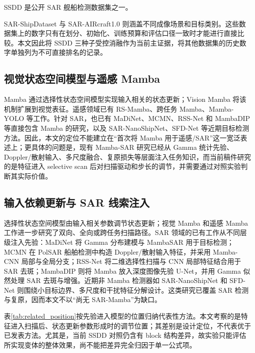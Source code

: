 \documentclass[UTF8,12pt,a4paper]{ctexart}
\begin{document}
SSDD 是公开 SAR 舰船检测数据集之一\cite{ssdd2017,ssdd2021}。

SAR-ShipDataset 与 SAR-AIRcraft1.0 则涵盖不同成像场景和目标类别\cite{sardataset,saraircraft}。这些数据集上的数字只有在划分、初始化、训练预算和评估口径一致时才能进行直接比较。本文因此将 SSDD 三种子受控消融作为当前主证据，将其他数据集的历史数字单独列为不可直接排名的记录。

\subsection{视觉状态空间模型与遥感 Mamba}
Mamba 通过选择性状态空间模型实现输入相关的状态更新\cite{mamba2023}；Vision Mamba 将该机制扩展到视觉表征\cite{vim2024}。遥感领域已有 RS-Mamba、跨任务 Mamba、Mamba-YOLO 等工作\cite{rsmamba2024,rstmtmamba2025,mambayolo2024}。针对 SAR，也已有 MaDiNet、MCMN、RSS-Net 和 MambaDIP 等直接包含 Mamba 的研究，以及 SAR-NanoShipNet、SFD-Net 等近期目标检测方法\cite{madinet2025,mcmn,rssnet,mambadip,sarnano,sfdnet}。因此，本文的定位不能建立在“首次将 Mamba 用于遥感/SAR”这一宽泛表述上；更具体的问题是，现有 Mamba-SAR 研究已经从 Gamma 统计先验、Doppler/散射输入、多尺度融合、复原损失等层面注入任务知识，而当前稿件研究的是特征进入 selective scan 后对扫描驱动和步长的调节，并需要通过对照实验判断其实际价值。

\subsection{输入依赖更新与 SAR 线索注入}
选择性状态空间模型由输入相关参数调节状态更新；视觉 Mamba 和遥感 Mamba 工作进一步研究了双向、全向或跨任务扫描路径\cite{mamba2023,vim2024,rsmamba2024,rstmtmamba2025}。SAR 领域的已有工作从不同层级注入先验：MaDiNet 将 Gamma 分布建模与 MambaSAR 用于目标检测；MCMN 在 PolSAR 船舶检测中构造 Doppler/散射输入特征，并采用 Mamba-CNN 局部与全局分支；RSS-Net 将二维选择性扫描与 CNN 局部特征结合用于 SAR 去斑；MambaDIP 则将 Mamba 放入深度图像先验 U-Net，并用 Gamma 似然处理 SAR 去斑与增强\cite{madinet2025,mcmn,rssnet,mambadip}。近期非 Mamba 检测器如 SAR-NanoShipNet 和 SFD-Net 则围绕小目标边界、多尺度和干扰特征分解设计\cite{sarnano,sfdnet}。这类研究已覆盖 SAR 检测与复原，因而本文不以“尚无 SAR-Mamba”为缺口。

表\ref{tab:related_position}按先验进入模型的位置归纳代表性方法。本文考察的是特征进入扫描后、状态更新参数形成时的调节位置；其差别是设计定位，不代表优于已发表方法。尤其是，当前 SSDD 对照仍含有 block 结构差异，故实验只能评估所实现变体的整体效果，尚不能把差异完全归因于单一公式项。
\end{document}
